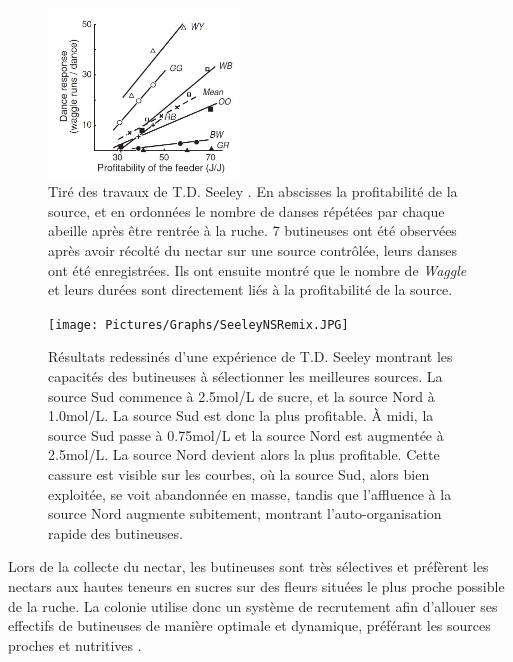 			
	\begin{figure}
	\centering
	\includegraphics[width=0.45\textwidth]{Pictures/Graphs/SeeleyWaggles.JPG}
	\caption[Tiré des travaux de T.D. Seeley \cite{seeley_wisdom_1995}. En abscisses la profitabilité de la source, et en ordonnées le nombre de 8 (de \textit{Waggle}) réalisés par chaque abeille par danse après être rentrée à la ruche.]{Tiré des travaux de T.D. Seeley \cite{seeley_wisdom_1995}. En abscisses la profitabilité de la source, et en ordonnées le nombre de danses répétées par chaque abeille après être rentrée à la ruche. 7 butineuses ont été observées après avoir récolté du nectar sur une source contrôlée, leurs danses ont été enregistrées. Ils ont ensuite montré que le nombre de \textit{Waggle} et leurs durées sont directement liés à la profitabilité de la source.}
	\label{SeeleyWaggles}
	\end{figure}
			
			\begin{figure}
			\centering
			\texttt{[image: Pictures/Graphs/SeeleyNSRemix.JPG]}
				\caption[Résultats redessinés d'une expérience de T.D. Seeley \cite{seeley_collective_1991} montrant les capacités des butineuses à sélectionner les meilleures sources.]{Résultats redessinés d'une expérience de T.D. Seeley \cite{seeley_collective_1991} montrant les capacités des butineuses à sélectionner les meilleures sources. La source Sud commence à 2.5mol/L de sucre, et la source Nord à 1.0mol/L. La source Sud est donc la plus profitable. À midi, la source Sud passe à 0.75mol/L et la source Nord est augmentée à 2.5mol/L. La source Nord devient alors la plus profitable. Cette cassure est visible sur les courbes, où la source Sud, alors bien exploitée, se voit abandonnée en masse, tandis que l’affluence à la source Nord augmente subitement, montrant l’auto-organisation rapide des butineuses.}
			\label{SeeleyNS}
			\end{figure}
	
			
			
			Lors de la collecte du nectar, les butineuses sont très sélectives et préfèrent les nectars aux hautes teneurs en sucres sur des fleurs situées le plus proche possible de la ruche. La colonie utilise donc un système de recrutement afin d'allouer ses effectifs de butineuses de manière optimale et dynamique, préférant les sources proches et nutritives \cite{riviere_modemulti-agent_2021}.
	
